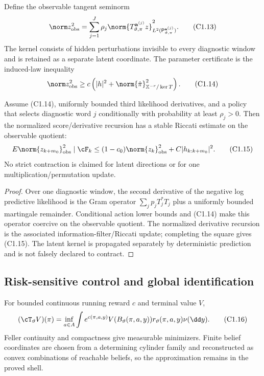Define the observable tangent seminorm
\[
 \norm z_{\rm obs}^2=
 \sum_{j=1}^J\rho_j
 \norm{T_{\vartheta,\pi}^{\mathbf a^{(j)}}z}^2_{
 L^2(\mathsf P_{\vartheta,\pi}^{\mathbf a^{(j)}})}.       \tag{C1.13}
\]
The kernel consists of hidden perturbations invisible to every diagnostic
window and is retained as a separate latent coordinate.  The parameter
certificate is the induced-law inequality
\[
 \norm z_{\rm obs}^2\ge c\left(|h|^2+
 \norm{\dot\pi}_{\mathbb X^{-r}/\ker T}^2\right).        \tag{C1.14}
\]

\begin{theorem}
\label{thm:r31-c1-observable-stability}
Assume (C1.14), uniformly bounded third likelihood derivatives, and a policy
that selects diagnostic word $j$ conditionally with probability at least
$\rho_j>0$.  Then the normalized score/derivative recursion has a stable
Riccati estimate on the observable quotient:
\[
 E\norm{z_{k+m_0}}_{\rm obs}^2\mid\cF_k
 \le (1-c_0)\norm{z_k}_{\rm obs}^2+C|h_{k:k+m_0}|^2.      \tag{C1.15}
\]
No strict contraction is claimed for latent directions or for one
multiplication/permutation update.
\end{theorem}

\begin{proof}
Over one diagnostic window, the second derivative of the negative log
predictive likelihood is the Gram operator
$\sum_jp_jT_j^*T_j$ plus a uniformly bounded martingale remainder.
Conditional action lower bounds and (C1.14) make this operator coercive on the
observable quotient.  The normalized derivative recursion is the associated
information-filter/Riccati update; completing the square gives (C1.15).
The latent kernel is propagated separately by deterministic prediction and is
not falsely declared to contract.
\end{proof}

\subsection{Risk-sensitive control and global identification}

For bounded continuous running reward $c$ and terminal value $V$,
\[
 (\cT_\vartheta V)(\pi)=\inf_{a\in A}
 \int e^{c(\pi,a,y)}V(B_\vartheta(\pi,a,y))
 r_\vartheta(\pi,a,y)\nu(\dd y).                          \tag{C1.16}
\]
Feller continuity and compactness give measurable minimizers.  Finite belief
coordinates are chosen from a determining cylinder family and reconstructed
as convex combinations of reachable beliefs, so the approximation remains in
the proved shell.

